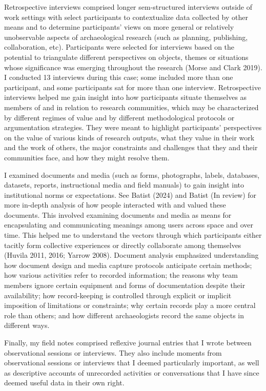 \documentclass[
]{article}
\begin{document}
Retrospective interviews comprised longer sem-structured interviews
outside of work settings with select participants to contextualize data
collected by other means and to determine participants' views on more
general or relatively unobservable aspects of archaeological research
(such as planning, publishing, collaboration, etc). Participants were
selected for interviews based on the potential to triangulate different
perspectives on objects, themes or situations whose significance was
emerging throughout the research (Morse and Clark 2019). I conducted 13
interviews during this case; some included more than one participant,
and some participants sat for more than one interview. Retrospective
interviews helped me gain insight into how participants situate
themselves as members of and in relation to research communities, which
may be characterized by different regimes of value and by different
methodological protocols or argumentation strategies. They were meant to
highlight participants' perspectives on the value of various kinds of
research outputs, what they value in their work and the work of others,
the major constraints and challenges that they and their communities
face, and how they might resolve them.

I examined documents and media (such as forms, photographs, labels,
databases, datasets, reports, instructional media and field manuals) to
gain insight into institutional norms or expectations. See Batist (2024)
and Batist (In review) for more in-depth analysis of how people
interacted with and valued these documents. This involved examining
documents and media as means for encapsulating and communicating
meanings among users across space and over time. This helped me to
understand the vectors through which participants either tacitly form
collective experiences or directly collaborate among themselves (Huvila
2011, 2016; Yarrow 2008). Document analysis emphasized understanding how
document design and media capture protocols anticipate certain methods;
how various activities refer to recorded information; the reasons why
team members ignore certain equipment and forms of documentation despite
their availability; how record-keeping is controlled through explicit or
implicit imposition of limitations or constraints; why certain records
play a more central role than others; and how different archaeologists
record the same objects in different ways.

Finally, my field notes comprised reflexive journal entries that I wrote
between observational sessions or interviews. They also include moments
from observational sessions or interviews that I deemed particularly
important, as well as descriptive accounts of unrecorded activities or
conversations that I have since deemed useful data in their own right.
\end{document}

